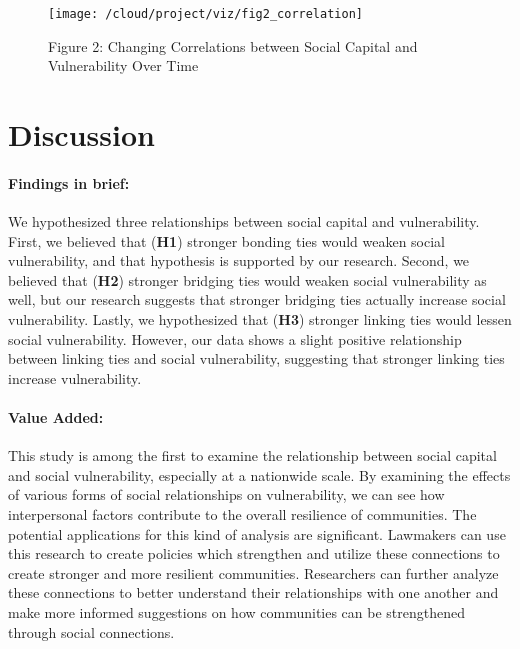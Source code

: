 \documentclass[]{elsarticle} %
\newcommand{\blandscape}{\begin{landscape}}
\newcommand{\elandscape}{\end{landscape}}
\begin{document}
\newpage
\blandscape

\begin{figure}
\texttt{[image: /cloud/project/viz/fig2\_correlation]} \caption{Figure 2: Changing Correlations between Social Capital and Vulnerability Over Time}\label{fig:fig2}
\end{figure}

\elandscape
\newpage

\hypertarget{discussion}{%
\section{Discussion}\label{discussion}}

\hypertarget{findings-in-brief}{%
\paragraph{Findings in brief:}\label{findings-in-brief}}

We hypothesized three relationships between social capital and
vulnerability. First, we believed that (\textbf{H1}) stronger bonding
ties would weaken social vulnerability, and that hypothesis is supported
by our research. Second, we believed that (\textbf{H2}) stronger
bridging ties would weaken social vulnerability as well, but our
research suggests that stronger bridging ties actually increase social
vulnerability. Lastly, we hypothesized that (\textbf{H3}) stronger
linking ties would lessen social vulnerability. However, our data shows
a slight positive relationship between linking ties and social
vulnerability, suggesting that stronger linking ties increase
vulnerability.

\hypertarget{value-added}{%
\paragraph{Value Added:}\label{value-added}}

This study is among the first to examine the relationship between social
capital and social vulnerability, especially at a nationwide scale. By
examining the effects of various forms of social relationships on
vulnerability, we can see how interpersonal factors contribute to the
overall resilience of communities. The potential applications for this
kind of analysis are significant. Lawmakers can use this research to
create policies which strengthen and utilize these connections to create
stronger and more resilient communities. Researchers can further analyze
these connections to better understand their relationships with one
another and make more informed suggestions on how communities can be
strengthened through social connections.
\end{document}
